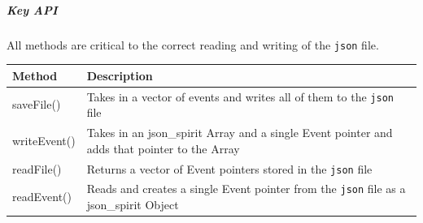 \documentclass[12pt]{extarticle}
\begin{document}
\subparagraph{Key API}All methods are critical to the correct reading and writing of the \texttt{json} file.\\
\begin{tabular}{p{6cm} p{12cm}}
Method & Description\\
\hline
saveFile() & Takes in a vector of events and writes all of them to the \texttt{json} file\\
writeEvent() & Takes in an json\_spirit Array and a single Event pointer and adds that pointer to the Array\\
readFile() & Returns a vector of Event pointers stored in the \texttt{json} file\\
readEvent() & Reads and creates a single Event pointer from the \texttt{json} file as a json\_spirit Object\\
\end{tabular}

\newpage
\end{document}
